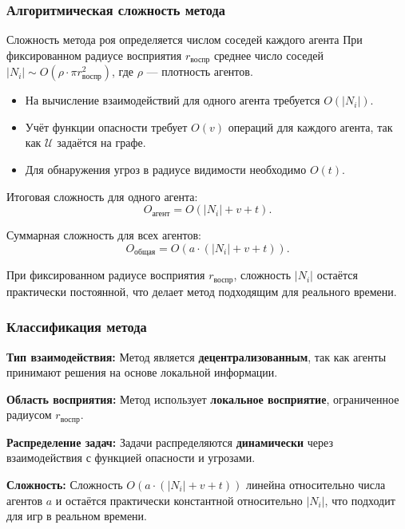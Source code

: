 \subsubsection*{Алгоритмическая сложность метода}
Сложность метода роя определяется числом соседей каждого агента
При фиксированном радиусе восприятия $r_{\text{воспр}}$ среднее число соседей $|N_i| \sim O(\rho \cdot \pi r_{\text{воспр}}^2)$, где $\rho$ — плотность агентов.  

\begin{itemize}
	\item На вычисление взаимодействий для одного агента требуется $O(|N_i|)$.
	\item Учёт функции опасности требует $O(v)$ операций для каждого агента, так как $\mathcal{U}$ задаётся на графе.
	\item Для обнаружения угроз в радиусе видимости необходимо $O(t)$.
\end{itemize}

Итоговая сложность для одного агента:
\begin{equation}
	O_{\text{агент}} = O(|N_i| + v + t).
\end{equation}

Суммарная сложность для всех агентов:
\begin{equation}
	O_{\text{общая}} = O(a \cdot (|N_i| + v + t)).
\end{equation}

При фиксированном радиусе восприятия $r_{\text{воспр}}$, сложность $|N_i|$ остаётся практически постоянной, что делает метод подходящим для реального времени.

\subsubsection*{Классификация метода}
\textbf{Тип взаимодействия:}  
Метод является \textbf{децентрализованным}, так как агенты принимают решения на основе локальной информации.  

\textbf{Область восприятия:}  
Метод использует \textbf{локальное восприятие}, ограниченное радиусом $r_{\text{воспр}}$.  

\textbf{Распределение задач:}  
Задачи распределяются \textbf{динамически} через взаимодействия с функцией опасности и угрозами.  

\textbf{Сложность:}  
Сложность $O(a \cdot (|N_i| + v + t))$ линейна относительно числа агентов $a$ и остаётся практически константной относительно $|N_i|$, что подходит для игр в реальном времени.  

